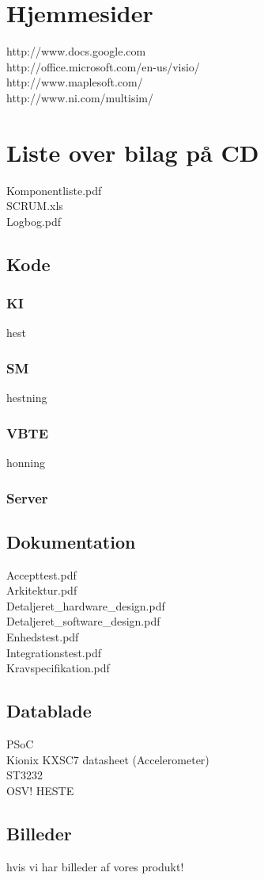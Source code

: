 \section{Hjemmesider}
http://www.docs.google.com\\
http://office.microsoft.com/en-us/visio/\\
http://www.maplesoft.com/\\
http://www.ni.com/multisim/\\

\section{Liste over bilag på CD}
Komponentliste.pdf\\
SCRUM.xls\\
Logbog.pdf\\
\subsection{Kode}
\subsubsection{KI}
hest
\subsubsection{SM}
hestning
\subsubsection{VBTE}
honning
\subsubsection{Server}
\subsection{Dokumentation}
Accepttest.pdf\\
Arkitektur.pdf\\
Detaljeret\_hardware\_design.pdf\\
Detaljeret\_software\_design.pdf\\
Enhedstest.pdf\\
Integrationstest.pdf\\
Kravspecifikation.pdf\\

\subsection{Datablade}
PSoC\\
Kionix KXSC7 datasheet (Accelerometer)\\
ST3232\\
OSV! HESTE\\

\subsection{Billeder}
hvis vi har billeder af vores produkt!\\